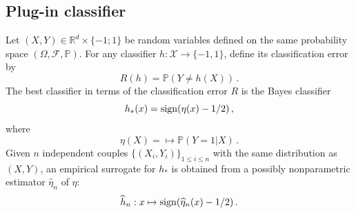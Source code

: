 \documentclass[a4paper,10pt,fleqn]{article}
\newcommand{\eqsp}{\,}
\newcommand{\calF}{\mathcal{F}}
\newcommand{\rset}{\ensuremath{\mathbb{R}}}
\newcommand{\bP}{\mathbb{P}}
\newcommand{\1}{\ensuremath{\mathbbm{1}}}
\begin{document}
\subsection{Plug-in classifier}
Let $(X,Y)\in\rset^d\times\{-1;1\}$ be random variables defined on the same probability space $(\Omega,\calF,\bP)$.
For any classifier $h:\mathcal{X}\to \{-1,1\}$, define its classification error by
$$
R(h)=\bP(Y\neq h(X))\eqsp.
$$
The best classifier in terms of the classification error $R$ is the Bayes classifier
$$
h_{*}(x)={\rm sign}(\eta(x)-1/2)\eqsp,
$$
where
$$
\eta(X) = \mapsto\bP(Y=1|X)\eqsp.
$$
Given $n$ independent couples $\{(X_i,Y_i)\}_{1\leqslant i \leqslant n}$ with the same distribution as $(X,Y)$, an empirical surrogate for $h_{*}$ is obtained from a possibly nonparametric estimator $\widehat \eta_n$ of $\eta$:
$$
\widehat h_n: x\mapsto {\rm sign}(\widehat \eta_n(x)-1/2)\eqsp.
$$
\end{document}
